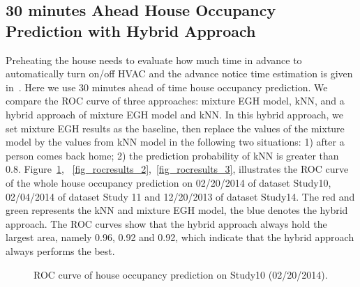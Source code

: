 \subsection{30 minutes Ahead House Occupancy Prediction with Hybrid Approach}
Preheating the house needs to evaluate how much time in advance to automatically turn on/off HVAC and the advance notice time estimation is given in~\cite{scott2011preheat}. 
Here we use 30 minutes ahead of time house occupancy prediction. 
We compare the ROC curve of three approaches: mixture EGH model, kNN, and a hybrid approach of mixture EGH model and kNN. 
In this hybrid approach, 
we set mixture EGH results as the baseline, 
then replace the values of the mixture model by the values from kNN model 
in the following two situations: 
1) after a person comes back home; 2) the prediction probability of kNN is greater than 0.8. 
Figure~\ref{fig_rocresults_1}, ~\ref{fig_rocresults_2},~\ref{fig_rocresults_3}, illustrates the ROC curve of the whole house occupancy prediction on 02/20/2014 of dataset Study10, 02/04/2014 of dataset Study 11 
and 12/20/2013 of dataset Study14. 
The red and green represents the kNN and mixture EGH model, 
the blue denotes the hybrid approach. 
The ROC curves show that the hybrid approach always hold the largest area, namely 
0.96, 0.92 and 0.92, 
which indicate that the hybrid approach always performs the best. 
%
\begin{figure}[h]
	\caption{
	ROC curve of house occupancy prediction on Study10 (02/20/2014).}
	\label{fig_rocresults_1}
\end{figure}

